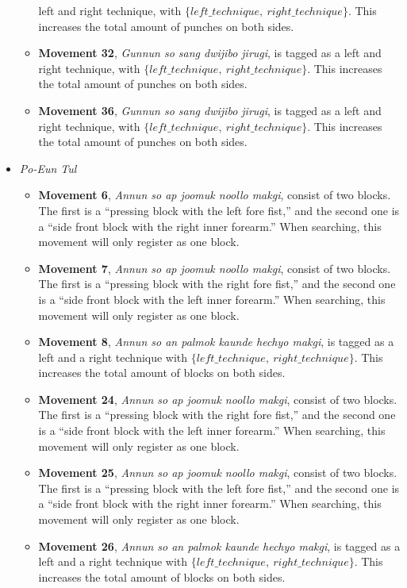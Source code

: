 \documentclass[10pt,twocolumn,a4paper]{article}
\begin{document}
\begin{itemize}
\begin{itemize}
        left and right technique, with $\{left\_technique, \:
        right\_technique\}$. This increases the total amount of punches on
        both sides.
      \item
        {\bf Movement 32}, \emph{Gunnun so sang dwijibo jirugi}, is tagged as
        a left and right technique, with $\{left\_technique, \:
        right\_technique\}$. This increases the total amount of punches on
        both sides.
      \item
        {\bf Movement 36}, \emph{Gunnun so sang dwijibo jirugi}, is tagged as
        a left and right technique, with $\{left\_technique, \:
        right\_technique\}$. This increases the total amount of punches on
        both sides.
    \end{itemize}
  \item
    \emph{Po-Eun Tul}
    \begin{itemize}
      \item
        {\bf Movement 6}, \emph{Annun so ap joomuk noollo makgi}, consist of
        two blocks. The first is a ``pressing block with the left fore fist,''
        and the second one is a ``side front block with the right inner
        forearm.'' When searching, this movement will only register as one
        block.
      \item
        {\bf Movement 7}, \emph{Annun so ap joomuk noollo makgi}, consist of
        two blocks. The first is a ``pressing block with the right fore
        fist,'' and the second one is a ``side front block with the left inner
        forearm.'' When searching, this movement will only register as one
        block.
      \item
        {\bf Movement 8}, \emph{Annun so an palmok kaunde hechyo makgi}, is
        tagged as a left and a right technique with $\{left\_technique, \:
        right\_technique\}$. This increases the total amount of blocks on both
        sides.
      \item
        {\bf Movement 24}, \emph{Annun so ap joomuk noollo makgi}, consist of
        two blocks. The first is a ``pressing block with the right fore
        fist,'' and the second one is a ``side front block with the left inner
        forearm.'' When searching, this movement will only register as one
        block.
      \item
        {\bf Movement 25}, \emph{Annun so ap joomuk noollo makgi}, consist of
        two blocks. The first is a ``pressing block with the left fore fist,''
        and the second one is a ``side front block with the right inner
        forearm.'' When searching, this movement will only register as one
        block.
      \item
        {\bf Movement 26}, \emph{Annun so an palmok kaunde hechyo makgi}, is
        tagged as a left and a right technique with $\{left\_technique, \:
        right\_technique\}$. This increases the total amount of blocks on both
        sides.
    \end{itemize}


\end{itemize}
\end{document}
